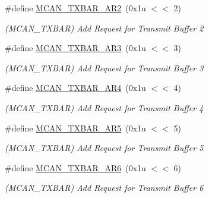 \begin{DoxyCompactItemize}
\mbox{\label{group__SAMV71__MCAN_gab5c052393df6c8020c0eaafe3866b8da}} 
\#define \mbox{\hyperlink{group__SAMV71__MCAN_gab5c052393df6c8020c0eaafe3866b8da}{M\+C\+A\+N\+\_\+\+T\+X\+B\+A\+R\+\_\+\+A\+R2}}~(0x1u $<$$<$ 2)
\begin{DoxyCompactList}\small\item\em (M\+C\+A\+N\+\_\+\+T\+X\+B\+AR) Add Request for Transmit Buffer 2 \end{DoxyCompactList}\item 
\mbox{\label{group__SAMV71__MCAN_gaf00a084f92823e440c36056b7e9fac1f}} 
\#define \mbox{\hyperlink{group__SAMV71__MCAN_gaf00a084f92823e440c36056b7e9fac1f}{M\+C\+A\+N\+\_\+\+T\+X\+B\+A\+R\+\_\+\+A\+R3}}~(0x1u $<$$<$ 3)
\begin{DoxyCompactList}\small\item\em (M\+C\+A\+N\+\_\+\+T\+X\+B\+AR) Add Request for Transmit Buffer 3 \end{DoxyCompactList}\item 
\mbox{\label{group__SAMV71__MCAN_gae9386708340ca11d7acd8e4b38930913}} 
\#define \mbox{\hyperlink{group__SAMV71__MCAN_gae9386708340ca11d7acd8e4b38930913}{M\+C\+A\+N\+\_\+\+T\+X\+B\+A\+R\+\_\+\+A\+R4}}~(0x1u $<$$<$ 4)
\begin{DoxyCompactList}\small\item\em (M\+C\+A\+N\+\_\+\+T\+X\+B\+AR) Add Request for Transmit Buffer 4 \end{DoxyCompactList}\item 
\mbox{\label{group__SAMV71__MCAN_gade80b4d15c74198f0c81d3430b7f9b9b}} 
\#define \mbox{\hyperlink{group__SAMV71__MCAN_gade80b4d15c74198f0c81d3430b7f9b9b}{M\+C\+A\+N\+\_\+\+T\+X\+B\+A\+R\+\_\+\+A\+R5}}~(0x1u $<$$<$ 5)
\begin{DoxyCompactList}\small\item\em (M\+C\+A\+N\+\_\+\+T\+X\+B\+AR) Add Request for Transmit Buffer 5 \end{DoxyCompactList}\item 
\mbox{\label{group__SAMV71__MCAN_ga4c81effd79147d7c881120ea241c66f7}} 
\#define \mbox{\hyperlink{group__SAMV71__MCAN_ga4c81effd79147d7c881120ea241c66f7}{M\+C\+A\+N\+\_\+\+T\+X\+B\+A\+R\+\_\+\+A\+R6}}~(0x1u $<$$<$ 6)
\begin{DoxyCompactList}\small\item\em (M\+C\+A\+N\+\_\+\+T\+X\+B\+AR) Add Request for Transmit Buffer 6 \end{DoxyCompactList}\item 
$$
\end{DoxyCompactItemize}
